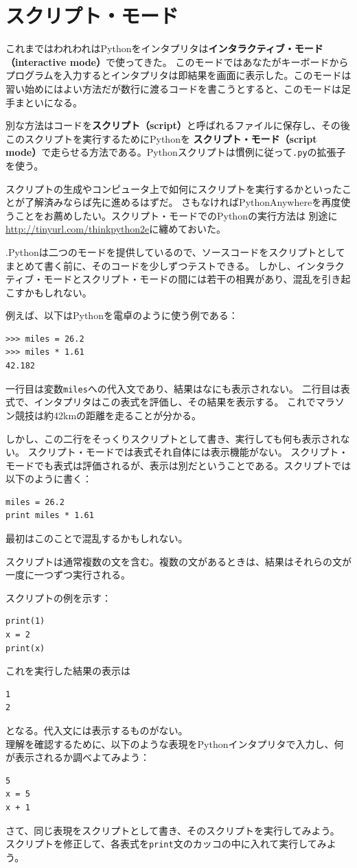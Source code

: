 \documentclass[a4j,12pt,makeidx]{jbook}
\begin{document}
\section{スクリプト・モード}
これまではわれわれはPythonをインタプリタは{\bf インタラクティブ・モード（interactive mode）}で使ってきた。
このモードではあなたがキーボードからプログラムを入力するとインタプリタは即結果を画面に表示した。このモードは
習い始めにはよい方法だが数行に渡るコードを書こうとすると、このモードは足手まといになる。\par
別な方法はコードを{\bf スクリプト（script）}と呼ばれるファイルに保存し、その後このスクリプトを実行するためにPythonを
{\bf スクリプト・モード（script mode）}で走らせる方法である。Pythonスクリプトは慣例に従って{\tt .py}の拡張子を使う。\par
スクリプトの生成やコンピュータ上で如何にスクリプトを実行するかといったことが了解済みならば先に進めるはずだ。
さもなければPythonAnywhereを再度使うことをお薦めしたい。スクリプト・モードでのPythonの実行方法は
別途に\url{http://tinyurl.com/thinkpython2e}に纏めておいた。\par
.Pythonは二つのモードを提供しているので、ソースコードをスクリプトとしてまとめて書く前に、そのコードを少しずつテストできる。
しかし、インタラクティブ・モードとスクリプト・モードの間には若干の相異があり、混乱を引き起こすかもしれない。\par
例えば、以下はPythonを電卓のように使う例である：
\begin{verbatim}
>>> miles = 26.2
>>> miles * 1.61
42.182
\end{verbatim}
一行目は変数{\tt miles}への代入文であり、結果はなにも表示されない。
二行目は表式で、インタプリタはこの表式を評価し、その結果を表示する。
これでマラソン競技は約42kmの距離を走ることが分かる。\par
しかし、この二行をそっくりスクリプトとして書き、実行しても何も表示されない。
スクリプト・モードでは表式それ自体には表示機能がない。
スクリプト・モードでも表式は評価されるが、表示は別だということである。スクリプトでは以下のように書く：
\begin{verbatim}
miles = 26.2
print miles * 1.61
\end{verbatim}
最初はこのことで混乱するかもしれない。\par
スクリプトは通常複数の文を含む。複数の文があるときは、結果はそれらの文が一度に一つずつ実行される。\par
スクリプトの例を示す：
\begin{verbatim}
print(1)
x = 2
print(x)
\end{verbatim}
これを実行した結果の表示は
\begin{verbatim}
1
2
\end{verbatim}
となる。代入文には表示するものがない。\\
理解を確認するために、以下のような表現をPythonインタプリタで入力し、何が表示されるか調べよてみよう：
\begin{verbatim}
5
x = 5
x + 1
\end{verbatim}
さて、同じ表現をスクリプトとして書き、そのスクリプトを実行してみよう。
スクリプトを修正して、各表式を{\tt print}文のカッコの中に入れて実行してみよう。
%
\end{document}
